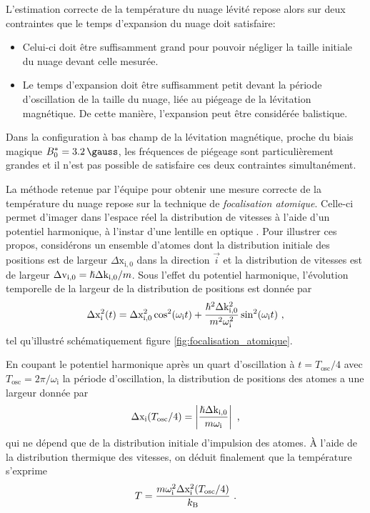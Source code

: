 L'estimation correcte de la température du nuage lévité repose alors sur deux contraintes que le temps d'expansion du nuage doit satisfaire: 
\begin{itemize}
\item[\textendash] Celui-ci doit être suffisamment grand pour pouvoir négliger la taille initiale du nuage devant celle mesurée.
\item[\textendash] Le temps d'expansion doit être suffisamment petit devant la période d'oscillation de la taille du nuage, liée au piégeage de la lévitation magnétique. De cette manière, l'expansion peut être considérée balistique.
\end{itemize}
Dans la configuration à bas champ de la lévitation magnétique, proche du biais magique $\magicB=\SI{3.2}{\gauss}$, les fréquences de piégeage sont particulièrement grandes et il n'est pas possible de satisfaire ces deux contraintes simultanément. 

La méthode retenue par l'équipe pour obtenir une mesure correcte de la température du nuage repose sur la technique de \emph{focalisation atomique}. Celle-ci permet d'imager dans l'espace réel la distribution de vitesses à l'aide d'un potentiel harmonique, à l'instar d'une lentille en optique \citep{murthy2014matter}. Pour illustrer ces propos, considérons un ensemble d'atomes dont la distribution initiale des positions est de largeur $\Delta\mathrm{x}_{\mathrm{i,0}}$ dans la direction $\vec{i}$ et la distribution de vitesses est de largeur $\Delta\mathrm{v}_{\mathrm{i,0}}=\hslash \Delta\mathrm{k}_{\mathrm{i,0}} /m$. Sous l'effet du potentiel harmonique, l'évolution temporelle de la largeur de la distribution de positions est donnée par
\begin{equation}
\Delta\mathrm{x}_{\mathrm{i}}^2(t)=\Delta\mathrm{x}_{\mathrm{i,0}}^2 \cos^2(\omega_{\mathrm{i}} t) + \frac{\hslash^2 \Delta\mathrm{k}_{\mathrm{i,0}}^2}{m^2 \omega_{\mathrm{i}}^2} \sin^2(\omega_{\mathrm{i}} t) \text{ ,}
\end{equation}
tel qu'illustré schématiquement figure \ref{fig:focalisation_atomique}.

En coupant le potentiel harmonique après un quart d'oscillation à $t=T_{\mathrm{osc}}/4$ avec $T_{\mathrm{osc}}= 2\pi/\omega_{\mathrm{i}}$ la période d'oscillation, la distribution de positions des atomes a une largeur donnée par
\begin{equation}
\Delta\mathrm{x}_{\mathrm{i}}(T_{\mathrm{osc}}/4)=\left|\frac{\hslash \Delta\mathrm{k}_{\mathrm{i,0}}}{m \omega_{\mathrm{i}}}\right| \text{ ,}
\end{equation}
qui ne dépend que de la distribution initiale d'impulsion des atomes. À l'aide de la distribution thermique des vitesses, on déduit finalement que la température s'exprime
\begin{equation}
T=\frac{m \omega_{\mathrm{i}}^2 \Delta \mathrm{x}_{\mathrm{i}}^2(T_{\mathrm{osc}}/4)}{k_{\mathrm{B}}} \text{ .}
\end{equation}

